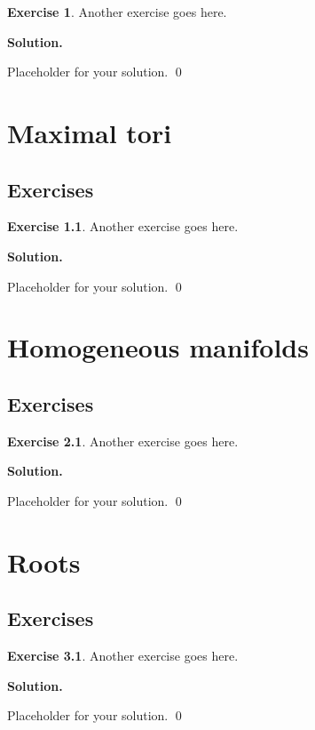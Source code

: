 \documentclass[12pt]{book}
\theoremstyle{definition}
\newtheorem{exercise}{Exercise}[chapter]
\newenvironment{solution}
{%
  \par\noindent\textbf{Solution.}\quad
}
{%
  \qed\par
}
\begin{document}
\begin{exercise}
Another exercise goes here.
\end{exercise}

\begin{solution}
Placeholder for your solution.
\end{solution}

\chapter{Maximal tori}
\section{Exercises}

\begin{exercise}
Another exercise goes here.
\end{exercise}

\begin{solution}
Placeholder for your solution.
\end{solution}

\chapter{Homogeneous manifolds}
\section{Exercises}

\begin{exercise}
Another exercise goes here.
\end{exercise}

\begin{solution}
Placeholder for your solution.
\end{solution}

\chapter{Roots}
\section{Exercises}

\begin{exercise}
Another exercise goes here.
\end{exercise}

\begin{solution}
Placeholder for your solution.
\end{solution}

\end{document}

